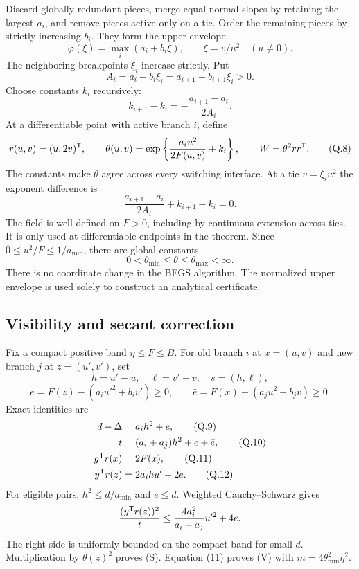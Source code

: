 \documentclass[10pt,oneside,openany]{book}
\theoremstyle{remark}\newtheorem{remark}{Remark}[chapter]
\begin{document}
Discard globally redundant pieces, merge equal normal slopes by retaining the largest $a_i$, and remove pieces active only on a tie. Order the remaining pieces by strictly increasing $b_i$. They form the upper envelope
\[
 \varphi(\xi)=\max_i(a_i+b_i\xi),\qquad \xi=v/u^2\quad(u\ne0).
\]
The neighboring breakpoints $\xi_i$ increase strictly. Put
\[
 A_i=a_i+b_i\xi_i=a_{i+1}+b_{i+1}\xi_i>0.
\]
Choose constants $k_i$ recursively:
\begin{equation}
 k_{i+1}-k_i=-\frac{a_{i+1}-a_i}{2A_i}. \tag{Q.7}
\end{equation}
At a differentiable point with active branch $i$, define
\begin{equation}
 r(u,v)=(u,2v)^{\mathsf T},\qquad
 \theta(u,v)=\exp\left\{\frac{a_i u^2}{2F(u,v)}+k_i\right\},
 \qquad W=\theta^2rr^{\mathsf T}. \tag{Q.8}
\end{equation}
The constants make $\theta$ agree across every switching interface. At a tie $v=\xi_i u^2$ the exponent difference is
\[
 \frac{a_{i+1}-a_i}{2A_i}+k_{i+1}-k_i=0.
\]
The field is well-defined on $F>0$, including by continuous extension across ties. It is only used at differentiable endpoints in the theorem. Since $0\le u^2/F\le1/a_{\min}$, there are global constants
\[
 0<\theta_{\min}\le\theta\le\theta_{\max}<\infty.
\]
There is no coordinate change in the BFGS algorithm. The normalized upper envelope is used solely to construct an analytical certificate.

\subsection{Visibility and secant correction}
Fix a compact positive band $\eta\le F\le B$. For old branch $i$ at $x=(u,v)$ and new branch $j$ at $z=(u',v')$, set
\[
 h=u'-u,\quad \ell=v'-v,\quad s=(h,\ell),
\]
\[
 e=F(z)-(a_i u'^2+b_i v')\ge0,\qquad
 \bar e=F(x)-(a_j u^2+b_jv)\ge0.
\]
Exact identities are
\begin{align}
 d-\Delta&=a_i h^2+e, \tag{Q.9}\\
 t&=(a_i+a_j)h^2+e+\bar e, \tag{Q.10}\\
 g^{\mathsf T} r(x)&=2F(x), \tag{Q.11}\\
 y^{\mathsf T} r(z)&=2a_i h u'+2e. \tag{Q.12}
\end{align}
For eligible pairs, $h^2\le d/a_{\min}$ and $e\le d$. Weighted Cauchy--Schwarz gives
\[
 \frac{(y^{\mathsf T} r(z))^2}{t}
 \le \frac{4a_i^2}{a_i+a_j}u'^2+4e.
\]
The right side is uniformly bounded on the compact band for small $d$. Multiplication by $\theta(z)^2$ proves (S). Equation (11) proves (V) with $m=4\theta_{\min}^2\eta^2$.
\end{document}
